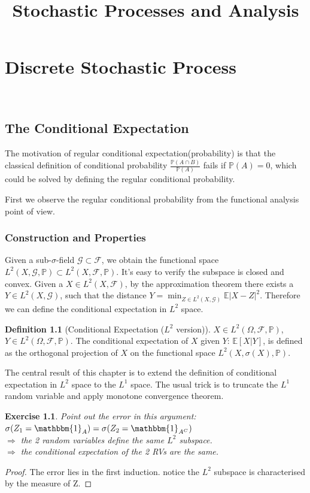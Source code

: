 \documentclass[a4paper,11pt]{book}
\newtheorem{exercise}{Exercise}[subsection]
\theoremstyle{definition}
\newtheorem{definition}{Definition}[section]
\theoremstyle{remark}
\begin{document}
\title{Stochastic Processes and Analysis}

\chapter{Discrete Stochastic Process}
\

\newpage
\section{The Conditional Expectation}
The motivation of regular conditional expectation(probability) is that the classical definition of conditional probability $\frac{\mathbb{P}(A \cap B)}{\mathbb{P}(A)}$ fails if $\mathbb{P}(A) = 0$, which could be solved by defining the regular conditional probability.\par 
 First we observe the regular conditional probability from the functional analysis point of view. 


\subsection{Construction and Properties}
Given a sub-$\sigma$-field $\mathcal{G}\subset \mathcal{F}$, we obtain the functional space $L^2(X, \mathcal{G}, \mathbb{P}) \subset L^2(X, \mathcal{F}, \mathbb{P})$. It's easy to verify the subspace is closed and convex. Given a $X \in L^2(X, \mathcal{F})$, by the approximation theorem there exists a $Y \in L^2(X, \mathcal{G})$, such that the distance $Y = \min_{ Z \in L^2(X, \mathcal{G})}\mathbb{E}|X - Z|^2$. Therefore we can define the conditional expectation in $L^2$ space.
\begin{definition}[Conditional Expectation ($L^2$ version)]
$X \in L^2(\Omega, \mathcal{F}, \mathbb{P})$, $Y \in L^2(\Omega, \mathcal{F}, \mathbb{P})$. The conditional expectation of $X$ given $Y$: $\mathbb{E}[X|Y]$,  is defined as the orthogonal projection of $X$ on the functional space $L^2(X, \sigma(X), \mathbb{P})$.
\end{definition}

The central result of this chapter is to extend the definition of conditional expectation in $L^2$ space to the $L^1$ space. The usual trick is to truncate the $L^1$ random variable and apply monotone convergence theorem.

\begin{exercise}
	Point out the error in this argument:\\
	$\sigma(Z_1 = \mathbbm{1}_A) = \sigma( Z_2 = \mathbbm{1}_{A^C})$\\
	$\Rightarrow$ the 2 random variables define the same $L^2$ subspace.\\
	$\Rightarrow$ the conditional expectation of the 2 RVs are the same.
\end{exercise}
\begin{proof}
	The error lies in the first induction. notice the $L^2$ subspace is characterised by the measure of Z.
\end{proof}
\end{document}
